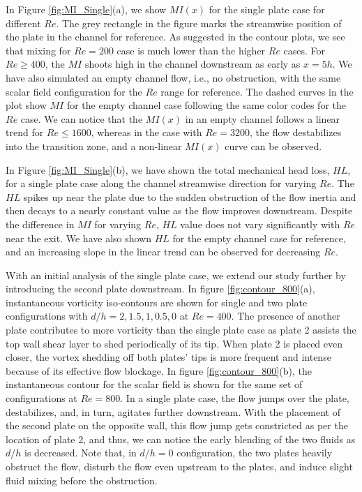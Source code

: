 \documentclass[reprint,a4paper,fleqn]{cas-dc} %
\begin{document}
		In Figure \ref{fig:MI_Single}(a), we show $MI(x)$ for the single plate case for different $Re$. The grey rectangle in the figure marks the streamwise position of the plate in the channel for reference. As suggested in the contour plots, we see that mixing for $Re=200$ case is much lower than the higher $Re$ cases. For $Re\geq400$, the $MI$ shoots high in the channel downstream as early as $x=5h$. We have also simulated an empty channel flow, i.e., no obstruction, with the same scalar field configuration for the $Re$ range for reference. The dashed curves in the plot show $MI$ for the empty channel case following the same color codes for the $Re$ case. We can notice that the $MI(x)$ in an empty channel follows a linear trend for $Re\leq1600$, whereas in the case with $Re=3200$, the flow destabilizes into the transition zone, and a non-linear $MI(x)$ curve can be observed.
		
		In Figure \ref{fig:MI_Single}(b), we have shown the total mechanical head loss, $HL$, for a single plate case along the channel streamwise direction for varying $Re$. The $HL$ spikes up near the plate due to the sudden obstruction of the flow inertia and then decays to a nearly constant value as the flow improves downstream. Despite the difference in $MI$ for varying $Re$, $HL$ value does not vary significantly with $Re$ near the exit. We have also shown $HL$ for the empty channel case for reference, and an increasing slope in the linear trend can be observed for decreasing $Re$.
		
		
		With an initial analysis of the single plate case, we extend our study further by introducing the second plate downstream. In figure \ref{fig:contour_800}(a), instantaneous vorticity iso-contours are shown for single and two plate configurations with $d/h=2,1.5,1,0.5,0$ at $Re=400$. The presence of another plate contributes to more vorticity than the single plate case as plate 2 assists the top wall shear layer to shed periodically of its tip. When plate 2 is placed even closer, the vortex shedding off both plates' tips is more frequent and intense because of its effective flow blockage. In figure  \ref{fig:contour_800}(b), the instantaneous contour for the scalar field is shown for the same set of configurations at $Re=800$. In a single plate case, the flow jumps over the plate, destabilizes, and, in turn, agitates further downstream. With the placement of the second plate on the opposite wall, this flow jump gets constricted as per the location of plate 2, and thus, we can notice the early blending of the two fluids as $d/h$ is decreased. Note that, in $d/h=0$ configuration, the two plates heavily obstruct the flow, disturb the flow even upstream to the plates, and induce slight fluid mixing before the obstruction.
		
\end{document}
